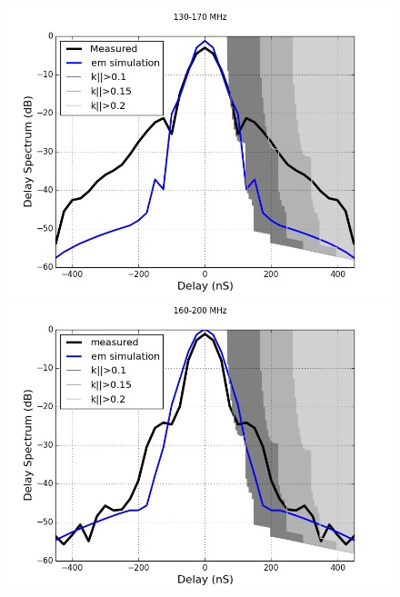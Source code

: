 \documentclass[twocolumn]{emulateapj}
\begin{document}
\begin{figure}[ht]
\begin{minipage}[b]{0.5\linewidth}
    \end{minipage}
    \vspace{0.1cm}
    \begin{minipage}[b]{0.5\linewidth}
    \centering
    \includegraphics[angle=0, width=\linewidth]{GB_reflectometry_part3/plot/130_170.png}
    \end{minipage}
    \hspace{0.1cm}
    \begin{minipage}[b]{0.5\linewidth}
    \centering
    \includegraphics[angle=0, width=\linewidth]{GB_reflectometry_part3/plot/160_200.png}
    \end{minipage}

\end{figure}
\end{document}
